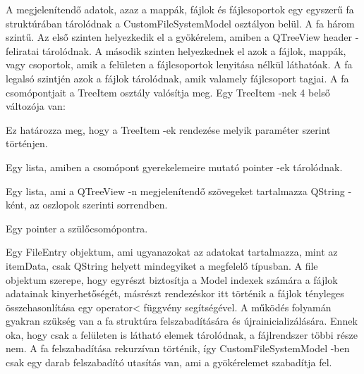 \vspace{3mm}


\vspace{3mm}

A megjelenítendő adatok, azaz a mappák, 
fájlok és fájlcsoportok egy egyszerű fa struktúrában tárolódnak 
a {\ttfamily CustomFileSystemModel} osztályon belül. 
A fa három szintű. Az első szinten helyezkedik el a gyökérelem, 
amiben a {\ttfamily QTreeView} header -feliratai tárolódnak. 
A második szinten helyezkednek el azok a fájlok,
mappák, vagy csoportok, 
amik a felületen a fájlcsoportok lenyitása nélkül láthatóak. 
A fa legalsó szintjén azok a fájlok tárolódnak, 
amik valamely fájlcsoport tagjai.
\newline
A fa csomópontjait a {\ttfamily TreeItem} osztály valósítja meg. 
Egy {\ttfamily TreeItem} -nek 4 belső változója van: 
\begin{description}[font=\normalfont\itshape\space]
\item [sortingType:]
Ez határozza meg, hogy a {\ttfamily TreeItem} -ek 
rendezése melyik paraméter szerint történjen.
\item [childItems:]
Egy lista, amiben a csomópont gyerekelemeire mutató pointer -ek tárolódnak.
\item [itemData:]
Egy lista, ami a {\ttfamily QTreeView} -n megjelenítendő szövegeket 
tartalmazza {\ttfamily QString} -ként,
az oszlopok szerinti sorrendben.
\item [parentItem:]
Egy pointer a szülőcsomópontra.
\item [file:]
Egy {\ttfamily FileEntry} objektum, 
ami ugyanazokat az adatokat tartalmazza, 
mint az itemData, 
csak {\ttfamily QString} helyett mindegyiket a megfelelő típusban. 
A {\ttfamily file} objektum szerepe, 
hogy egyrészt biztosítja a Model indexek számára a fájlok adatainak kinyerhetőségét, 
másrészt rendezéskor itt történik a fájlok tényleges összehasonlítása 
egy {\ttfamily operator<} függvény segítségével. 
A működés folyamán gyakran szükség van a fa struktúra felszabadítására és újrainicializálására. 
Ennek oka, hogy csak a felületen is látható elemek tárolódnak, 
a fájlrendszer többi része nem. 
A fa felszabadítása rekurzívan történik, 
így {\ttfamily CustomFileSystemModel} -ben
csak egy darab felszabadító utasítás van,
ami a gyökérelemet szabadítja fel.
\end{description} 

\vspace{2mm}

